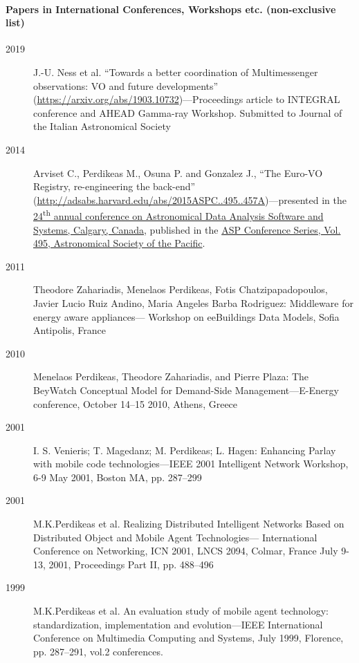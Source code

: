 \documentclass[10pt,a4paper]{article} %
\begin{document}
\paragraph{Papers in International Conferences, Workshops etc. (non-exclusive list)}
\begin{description}
\item[2019] J.-U. Ness et al. ``Towards a better coordination of Multimessenger observations: VO and future developments''
  (\href{https://arxiv.org/abs/1903.10732}{https://arxiv.org/abs/1903.10732})---Proceedings article to  INTEGRAL conference and  AHEAD Gamma-ray Workshop. Submitted to Journal of the Italian Astronomical Society
\item[2014] Arviset C., Perdikeas M., Osuna P. and Gonzalez J., ``The Euro-VO Registry, re-engineering the back-end'' (\href{http://adsabs.harvard.edu/abs/2015ASPC..495..457A}{http://adsabs.harvard.edu/abs/2015ASPC..495..457A})---presented in the \href{http://www.adass2014.org/announcements_en.php}{24\textsuperscript{th} annual conference on Astronomical Data Analysis Software and Systems, Calgary, Canada}, published in the
  \href{http://aspbooks.org/custom/publications/paper/495-0457.html}{ASP Conference Series, Vol. 495, Astronomical Society of the Pacific}.
  
\item[2011] Theodore Zahariadis, Menelaos Perdikeas, Fotis Chatzipapadopoulos, Javier Lucio Ruiz Andino,
  Maria Angeles Barba Rodriguez: Middleware for energy aware appliances--- Workshop on eeBuildings Data Models, Sofia Antipolis, France
\item[2010] Menelaos Perdikeas, Theodore Zahariadis, and Pierre Plaza: The BeyWatch Conceptual Model for Demand-Side Management---E-Energy conference, October 14--15 2010, Athens, Greece
\item[2001] I. S. Venieris; T. Magedanz; M. Perdikeas; L. Hagen: Enhancing Parlay with mobile code technologies---IEEE 2001 Intelligent Network Workshop, 6-9 May 2001, Boston MA, pp. 287--299
\item[2001] M.K.Perdikeas et al. Realizing Distributed Intelligent Networks Based on Distributed Object and Mobile Agent Technologies--- International Conference on Networking, ICN 2001, LNCS 2094, Colmar, France July 9-13, 2001, Proceedings Part II, pp. 488--496
\item[1999] M.K.Perdikeas et al. An evaluation study of mobile agent technology: standardization, implementation and evolution---IEEE International Conference on Multimedia Computing and Systems, July 1999, Florence, pp. 287--291, vol.2
  conferences.
  
\end{description}
\end{document}
